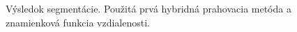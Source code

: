 \documentclass[a4paper,11pt,oneside]{article}%
\begin{document}
\begin{figure}[H]
    \hspace{5px}
    \hspace{5px}
    \caption{Výsledok segmentácie. Použitá prvá hybridná prahovacia metóda a znamienková funkcia vzdialenosti.}
    \label{fig:hybrid1_sdf}
\end{figure}
\end{document}
